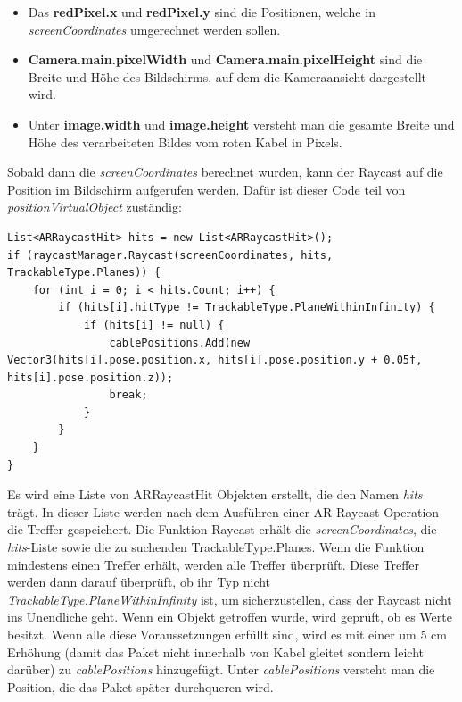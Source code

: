 \begin{itemize}
    \begin{itemize}
        \item Das \textbf{redPixel.x} und \textbf{redPixel.y} sind die Positionen, welche in \textit{screenCoordinates} umgerechnet werden sollen.
        \item \textbf{Camera.main.pixelWidth} und \textbf{Camera.main.pixelHeight} sind die Breite und Höhe des Bildschirms, auf dem die Kameraansicht dargestellt wird.
        \item Unter \textbf{image.width} und \textbf{image.height} versteht man die gesamte Breite und Höhe des verarbeiteten Bildes vom roten Kabel in Pixels.
    \end{itemize}
    Sobald dann die \textit{screenCoordinates} berechnet wurden, kann der Raycast auf die Position im Bildschirm aufgerufen werden. Dafür ist dieser Code teil von \textit{positionVirtualObject} zuständig:
    \begin{lstlisting}[style=csharp, caption={Raycast schießen}, label=code:createRaycast]
List<ARRaycastHit> hits = new List<ARRaycastHit>();
if (raycastManager.Raycast(screenCoordinates, hits, TrackableType.Planes)) {
    for (int i = 0; i < hits.Count; i++) {
        if (hits[i].hitType != TrackableType.PlaneWithinInfinity) {
            if (hits[i] != null) {
                cablePositions.Add(new Vector3(hits[i].pose.position.x, hits[i].pose.position.y + 0.05f, hits[i].pose.position.z));
                break;
            }
        }
    }
}
    \end{lstlisting}
    Es wird eine Liste von ARRaycastHit Objekten erstellt, die den Namen \textit{hits} trägt. In dieser Liste werden nach dem Ausführen einer AR-Raycast-Operation die Treffer gespeichert. Die Funktion Raycast erhält die \textit{screenCoordinates}, die \textit{hits}-Liste sowie die zu suchenden TrackableType.Planes.
    Wenn die Funktion mindestens einen Treffer erhält, werden alle Treffer überprüft. Diese Treffer werden dann darauf überprüft, ob ihr Typ nicht \textit{TrackableType.PlaneWithinInfinity} ist, um sicherzustellen, dass der Raycast nicht ins Unendliche geht. Wenn ein Objekt getroffen wurde, wird geprüft, ob es Werte besitzt. Wenn alle diese Voraussetzungen erfüllt sind, wird es mit einer um 5 cm Erhöhung (damit das Paket nicht innerhalb von Kabel gleitet sondern leicht darüber) zu \textit{cablePositions} hinzugefügt. Unter \textit{cablePositions} versteht man die Position, die das Paket später durchqueren wird.


\end{itemize}
